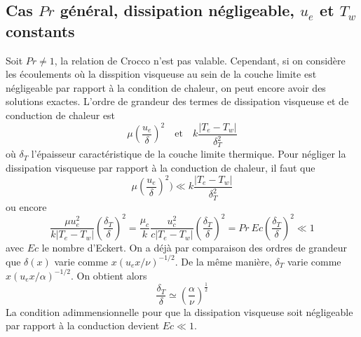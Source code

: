     \subsection{Cas $Pr$ général, dissipation négligeable, $u_e$ et $T_w$ constants}
      Soit $Pr \neq 1$, la relation de Crocco n'est pas valable. Cependant, si on considère les écoulements où la disspition visqueuse au sein de la couche limite est négligeable par rapport à la condition de chaleur, on peut encore avoir des solutions exactes. L'ordre de grandeur des termes de dissipation visqueuse et de conduction de chaleur est
      \begin{equation}
        \mu \left(\frac{u_e}{\delta}\right)^2 \quad \textrm{et} \quad k\frac{|T_e - T_w|}{\delta_T^2}
      \end{equation}
      où $\delta_T$ l'épaisseur caractéristique de la couche limite thermique. Pour négliger la dissipation visqueuse par rapport à la conduction de chaleur, il faut que
      \begin{equation}
        \mu \left(\frac{u_e}{\delta}\right)^2) \ll k\frac{|T_e - T_w|}{\delta_T^2}
      \end{equation}
      ou encore
      \begin{equation}
        \frac{\mu u_e^2}{k |T_e - T_w|} \left(\frac{\delta_T}{\delta}\right)^2 = \frac{\mu_c}{k} \frac{u_c^2}{c |T_e - T_w|} \left(\frac{\delta_T}{\delta}\right)^2 = Pr~Ec \left(\frac{\delta_T}{\delta}\right)^2 \ll 1
      \end{equation}
      avec $Ec$ le nombre d'Eckert. On a déjà par comparaison des ordres de grandeur que $\delta(x)$ varie comme $x(u_e x/\nu)^{-1/2}$. De la même manière, $\delta_T$ varie comme $x(u_e x/\alpha)^{-1/2}$. On obtient alors
      \begin{equation}
        \frac{\delta_T}{\delta} \simeq \left(\frac{\alpha}{\nu}\right)^\frac{1}{2}
      \end{equation}
      La condition adimmensionnelle pour que la dissipation visqueuse soit négligeable par rapport à la conduction devient $Ec \ll 1$.

